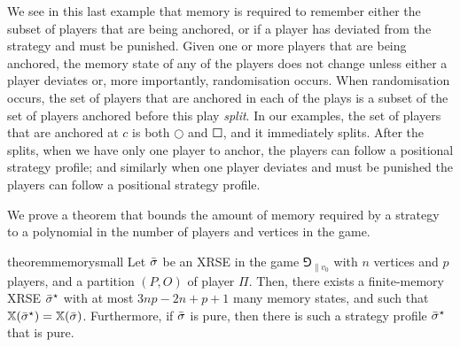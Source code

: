 We see in this last example that memory is required to remember either the subset of players that are being anchored, or if a player has deviated from the strategy and must be punished. 
Given one or more players that are being anchored, the memory state of any of the players does not change unless either a player deviates or, more importantly, randomisation occurs. When randomisation occurs, the set of players that are anchored in each of the plays is a subset of the set of players anchored before this play \emph{split}.
In our examples, the set of players that are anchored at $c$ is both $\Circle$ and $\Square$, and it immediately splits.
After the splits, when we have only one player to anchor, the players can follow a positional strategy profile; and similarly when one player deviates and must be punished the players can follow a positional strategy profile.


We prove a theorem that bounds the amount of memory required by a strategy to a polynomial in the number of players and vertices in the game. %
\begin{restatable}{theorem}{memorysmall}\label{thm:memorysmall}
    Let ${\bar{\sigma}}$ be an XRSE in the game $\Game_{\|v_0}$ with $n$ vertices and $p$ players,  and a partition $(P, O)$ of player $\Pi$.
    Then, there exists a finite-memory XRSE ${\bar{\sigma}}^\star$ with at most $3np-2n+p+1$ many memory states, and such that $\mathbb{X}({\bar{\sigma}}^\star) = \mathbb{X}({\bar{\sigma}})$. Furthermore, if ${\bar{\sigma}}$ is pure, then there is such a strategy profile ${\bar{\sigma}}^\star$ that is pure.
\end{restatable}

